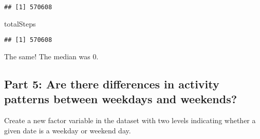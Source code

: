\documentclass[
]{article}
\newenvironment{Shaded}{\begin{snugshade}}{\end{snugshade}}
\newcommand{\AttributeTok}[1]{\textcolor[rgb]{0.77,0.63,0.00}{#1}}
\newcommand{\ConstantTok}[1]{\textcolor[rgb]{0.00,0.00,0.00}{#1}}
\newcommand{\FunctionTok}[1]{\textcolor[rgb]{0.00,0.00,0.00}{#1}}
\newcommand{\NormalTok}[1]{#1}
\newcommand{\OtherTok}[1]{\textcolor[rgb]{0.56,0.35,0.01}{#1}}
\newcommand{\SpecialCharTok}[1]{\textcolor[rgb]{0.00,0.00,0.00}{#1}}
\newcommand{\StringTok}[1]{\textcolor[rgb]{0.31,0.60,0.02}{#1}}
\begin{document}
\begin{verbatim}
## [1] 570608
\end{verbatim}

\begin{Shaded}
\begin{Highlighting}[]
\NormalTok{totalSteps}
\end{Highlighting}
\end{Shaded}

\begin{verbatim}
## [1] 570608
\end{verbatim}

The same! The median was 0.

\hypertarget{part-5-are-there-differences-in-activity-patterns-between-weekdays-and-weekends}{%
\subsection{Part 5: Are there differences in activity patterns between
weekdays and
weekends?}\label{part-5-are-there-differences-in-activity-patterns-between-weekdays-and-weekends}}

Create a new factor variable in the dataset with two levels indicating
whether a given date is a weekday or weekend day.

\begin{Shaded}
\end{Shaded}
\end{document}
